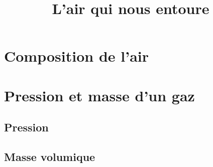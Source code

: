 \documentclass[xcolor={dvipsnames}]{beamer}
\title{L'air qui nous entoure}
\begin{document}
\begin{frame}
  \titlepage 
\end{frame}

\section{Composition de l'air}



%
%			
%			
%			



\begin{frame}


\end{frame}


\section{Pression et masse d'un gaz}

\subsection{Pression}

\begin{frame}

	
\end{frame}


\subsection{Masse volumique}
\begin{frame}

	
\end{frame}


%
%	
%
%
%	
\end{document}
